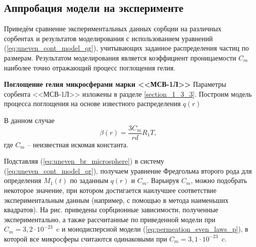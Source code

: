\subsection{Аппробация модели на эксперименте}
\label{section_2_3_4}

Приведём сравнение экспериментальных данных сорбции на различных сорбентах и результатов моделирования с использованием  уравнений (\ref{eq:uneven_cont_model_qr}), учитывающих заданное распределения частиц по размерам. Результатом моделирования является коэффициент проницаемости $C_m$ наиболее точно отражающий процесс поглощения гелия. 


\textbf{Поглощение гелия микросферами марки <<МСВ-1Л>>} Параметры сорбента <<МСВ-1Л>> изложены в разделе \ref{section_1_3_3}. Построим модель процесса поглощения на основе известного распределения $q(r)$ 

В данном случае 
\begin{equation}
\label{eq:uneven_br_microsphere}
\beta(r) = \frac{3 C_m}{r d} R_1 T,
\end{equation}
где $C_m$ -- неизвестная искомая константа. 

Подставляя (\ref{eq:uneven_br_microsphere}) в систему (\ref{eq:uneven_cont_model_qr}), получаем уравнение Фредгольма второго рода для определения $M_1(t)$ по заданным $q(r)$ и $C_m$. Варьируя $C_m$, можно подобрать некоторое значение, при котором достигается наилучшее соответствие экспериментальным данным (например, с помощью в метода наименьших квадратов). На рис. 
приведены сорбционные зависимости, полученные экспериментально, а также рассчитанные по приведенной модели при $C_m=3,2\cdot 10^{-23}$~c и монодисперсной модели  (\ref{eq:permeation_even_laws_p}), в которой все микросферы считаются одинаковыми при $C_m = 3,1\cdot 10^{-23}$~c.


%


